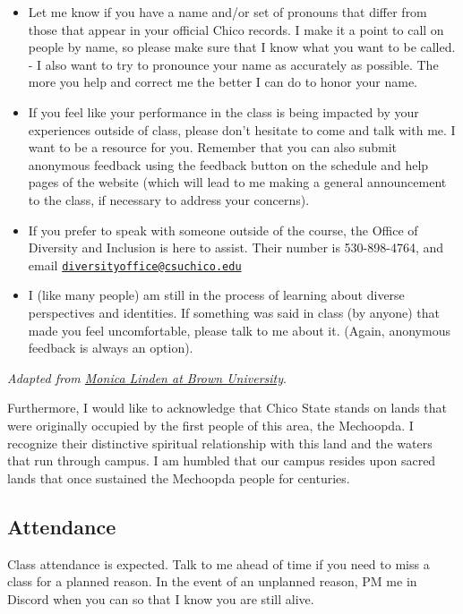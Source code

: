 \documentclass[
  letterpaper,
  DIV=11,
  numbers=noendperiod]{scrartcl}
\providecommand{\tightlist}{%
  \setlength{\itemsep}{0pt}\setlength{\parskip}{0pt}}\usepackage{longtable,booktabs,array}
\begin{document}
\begin{itemize}
\tightlist
\item
  Let me know if you have a name and/or set of pronouns that differ from
  those that appear in your official Chico records. I make it a point to
  call on people by name, so please make sure that I know what you want
  to be called. - I also want to try to pronounce your name as
  accurately as possible. The more you help and correct me the better I
  can do to honor your name.
\item
  If you feel like your performance in the class is being impacted by
  your experiences outside of class, please don't hesitate to come and
  talk with me. I want to be a resource for you. Remember that you can
  also submit anonymous feedback using the feedback button on the
  schedule and help pages of the website (which will lead to me making a
  general announcement to the class, if necessary to address your
  concerns).
\item
  If you prefer to speak with someone outside of the course, the Office
  of Diversity and Inclusion is here to assist. Their number is
  530-898-4764, and email
  \href{mailto:diversityoffice@csuchico.edu}{\nolinkurl{diversityoffice@csuchico.edu}}
\item
  I (like many people) am still in the process of learning about diverse
  perspectives and identities. If something was said in class (by
  anyone) that made you feel uncomfortable, please talk to me about it.
  (Again, anonymous feedback is always an option).
\end{itemize}

\emph{Adapted from
\href{https://www.brown.edu/sheridan/teaching-learning-resources/inclusive-teaching/statements}{Monica
Linden at Brown University}}.

Furthermore, I would like to acknowledge that Chico State stands on
lands that were originally occupied by the first people of this area,
the Mechoopda. I recognize their distinctive spiritual relationship with
this land and the waters that run through campus. I am humbled that our
campus resides upon sacred lands that once sustained the Mechoopda
people for centuries.

\hypertarget{attendance}{%
\subsection{Attendance}\label{attendance}}

Class attendance is expected. Talk to me ahead of time if you need to
miss a class for a planned reason. In the event of an unplanned reason,
PM me in Discord when you can so that I know you are still alive.
\end{document}

